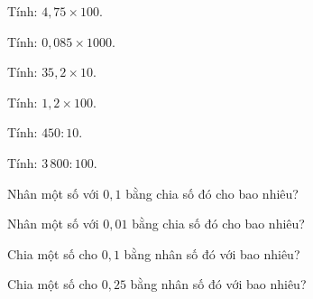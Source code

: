 
\begin{ex}
  Tính: $4{,}75 \times 100$.
\end{ex}

\begin{ex}
  Tính: $0{,}085 \times 1000$.
\end{ex}

\begin{ex}
  Tính: $35{,}2 \times 10$.
\end{ex}

\begin{ex}
  Tính: $1{,}2 \times 100$.
\end{ex}

\begin{ex}
  Tính: $450 : 10$.
\end{ex}

\begin{ex}
  Tính: $3\,800 : 100$.
\end{ex}

\begin{ex}
  Nhân một số với $0{,}1$ bằng chia số đó cho bao nhiêu?
\end{ex}

\begin{ex}
  Nhân một số với $0{,}01$ bằng chia số đó cho bao nhiêu?
\end{ex}

\begin{ex}
  Chia một số cho $0{,}1$ bằng nhân số đó với bao nhiêu?
\end{ex}

\begin{ex}
  Chia một số cho $0{,}25$ bằng nhân số đó với bao nhiêu?
\end{ex}

